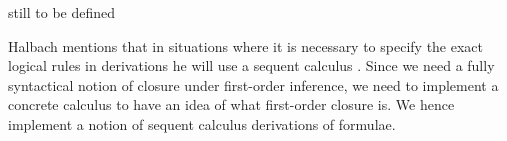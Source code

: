 \begin{definition}\label{def:subst}
  still to be defined
\end{definition}

Halbach mentions that in situations where it is necessary to specify the exact logical rules in derivations he will use a sequent calculus \cite[p. 29]{halbach:2011}. Since we need a fully syntactical notion of closure under first-order inference, we need to implement a concrete calculus to have an idea of what first-order closure is. We hence implement a notion of sequent calculus derivations of formulae.

